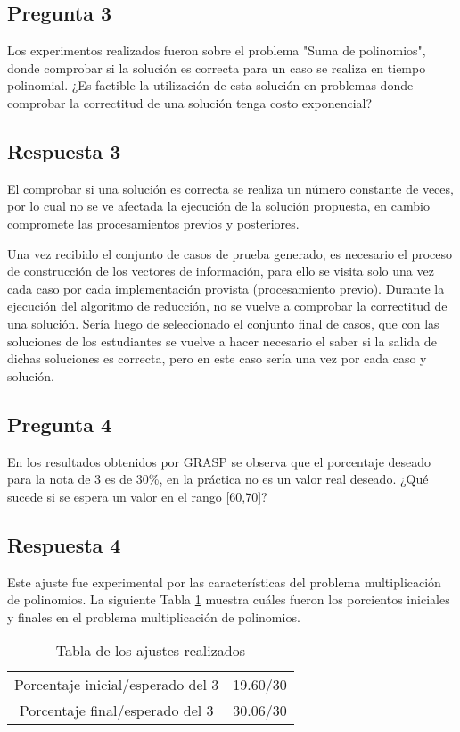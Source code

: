 \documentclass[a4paper,11pt]{article}
\begin{document}
		\subsection*{Pregunta 3}
		Los experimentos realizados fueron sobre el problema "Suma de polinomios", donde comprobar si la solución es correcta para un caso se realiza en tiempo polinomial. ¿Es factible la utilización de esta solución en problemas donde comprobar la correctitud de una solución tenga costo exponencial?
		\subsection*{Respuesta 3}
		El comprobar si una solución es correcta se realiza un número constante de veces, por lo cual no se ve afectada la ejecución de la solución propuesta, en cambio compromete las procesamientos previos y posteriores.
		
		Una vez recibido el conjunto de casos de prueba generado, es necesario el proceso de construcción de los vectores de información, para ello se visita solo una vez cada caso por cada implementación provista (procesamiento previo). Durante la ejecución del algoritmo de reducción, no se vuelve a comprobar la correctitud de una solución. Sería luego de seleccionado el conjunto final de casos, que con las soluciones de los estudiantes se vuelve a hacer necesario el saber si la salida de dichas soluciones es correcta, pero en este caso sería una vez por cada caso y solución.
		
		\subsection*{Pregunta 4}
		En los resultados obtenidos por GRASP se observa que el porcentaje deseado para la nota de 3 es de 30\%, en la práctica no es un valor real deseado. ¿Qué sucede si se espera un valor en el rango [60,70]?
		
		\subsection*{Respuesta 4}
		Este ajuste fue experimental por las características del problema multiplicación de polinomios. La siguiente Tabla \ref{tab:tabla} muestra cuáles fueron los porcientos iniciales y finales en el problema multiplicación de polinomios.
		
		\begin{table}[h]
			\begin{center}
				\begin{tabular}{| c | c |} \hline
				Porcentaje inicial/esperado del 3 & 19.60/30 \\
				Porcentaje final/esperado del 3 & 30.06/30 \\ \hline
				
				\end{tabular}
				\caption{Tabla de los ajustes realizados}
				\label{tab:tabla}
			\end{center}
		\end{table}
	
\end{document}

